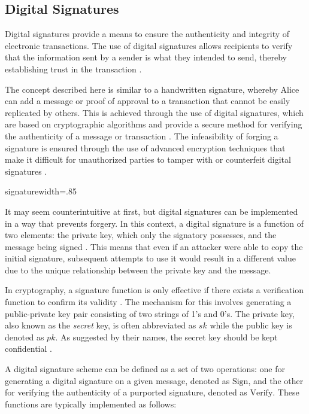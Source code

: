 \subsection{Digital Signatures}
Digital signatures provide a means to ensure the authenticity and integrity of electronic transactions. The use of digital signatures allows
recipients to verify that the information sent by a sender is what they intended to send, thereby establishing trust in the transaction
\cite{stinson2018cryptography}.

The concept described here is similar to a handwritten signature, whereby Alice can add a message or proof of approval to a transaction that
cannot be easily replicated by others. This is achieved through the use of digital signatures, which are based on cryptographic algorithms and
provide a secure method for verifying the authenticity of a message or transaction \cite{elgamal1985public}. The infeasibility of forging a
signature is ensured through the use of advanced encryption techniques that make it difficult for unauthorized parties to tamper with or
counterfeit digital signatures \cite{elgamal1985public}.

{signature}{width=.85\textwidth}%

It may seem counterintuitive at first, but digital signatures can be implemented in a way that prevents forgery. In this context, a digital
signature is a function of two elements: the private key, which only the signatory possesses, and the message being signed \cite{diffie2022new}.
This means that even if an attacker were able to copy the initial signature, subsequent attempts to use it would result in a different value
due to the unique relationship between the private key and the message.

In cryptography, a signature function is only effective if there exists a verification function to confirm its validity
\cite{stallings2006cryptography}. The mechanism for this involves generating a public-private key pair consisting of two strings of 1's and
0's. The private key, also known as the \textit{secret} key, is often abbreviated as $sk$ while the public key is denoted as $pk$. As
suggested by their names, the secret key should be kept confidential \cite{dss}.

A digital signature scheme can be defined as a set of two operations: one for generating a digital signature on a given message, denoted as
$\text{Sign}$, and the other for verifying the authenticity of a purported signature, denoted as $\text{Verify}$. These functions are typically
implemented as follows:


